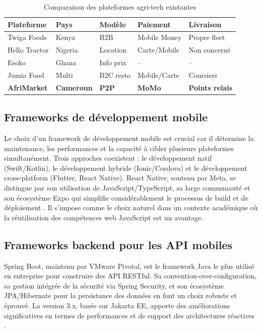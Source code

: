 \documentclass[12pt, a4paper, oneside]{report}
\begin{document}
\begin{table}[H]
  \centering
  \caption{Comparaison des plateformes agri-tech existantes}
  \label{tab:comparaison_plateformes}
  \begin{tabular}{|l|l|l|l|l|}
    \hline
    \textbf{Plateforme} & \textbf{Pays} & \textbf{Modèle} & \textbf{Paiement} & \textbf{Livraison} \\
    \hline
    Twiga Foods   & Kenya     & B2B       & Mobile Money & Propre fleet \\
    \hline
    Hello Tractor & Nigeria   & Location  & Carte/Mobile & Non concerné \\
    \hline
    Esoko         & Ghana     & Info prix & -- & -- \\
    \hline
    Jumia Food    & Multi     & B2C resto & Mobile/Carte & Coursiers \\
    \hline
    \textbf{AfriMarket} & \textbf{Cameroun} & \textbf{P2P} & \textbf{MoMo} & \textbf{Points relais} \\
    \hline
  \end{tabular}
\end{table}

\subsection{Frameworks de développement mobile}

Le choix d'un framework de développement mobile est crucial car il détermine la
maintenance, les performances et la capacité à cibler plusieurs plateformes simultanément.
Trois approches coexistent : le développement natif (Swift/Kotlin), le développement
hybride (Ionic/Cordova) et le développement cross-platform (Flutter, React Native).
React Native, soutenu par Meta, se distingue par son utilisation de JavaScript/TypeScript,
sa large communauté et son écosystème Expo qui simplifie considérablement le processus de
build et de déploiement \cite{eisenman2015}. Il s'impose comme le choix naturel dans un
contexte académique où la réutilisation des compétences web JavaScript est un avantage.

\subsection{Frameworks backend pour les API mobiles}

Spring Boot, maintenu par VMware Pivotal, est le framework Java le plus utilisé en
entreprise pour construire des API RESTful. Sa convention-over-configuration, sa gestion
intégrée de la sécurité via Spring Security, et son écosystème JPA/Hibernate pour la
persistance des données en font un choix robuste et éprouvé. La version 3.x, basée sur
Jakarta EE, apporte des améliorations significatives en termes de performances et de
support des architectures réactives \cite{springboot2024}.
\end{document}
